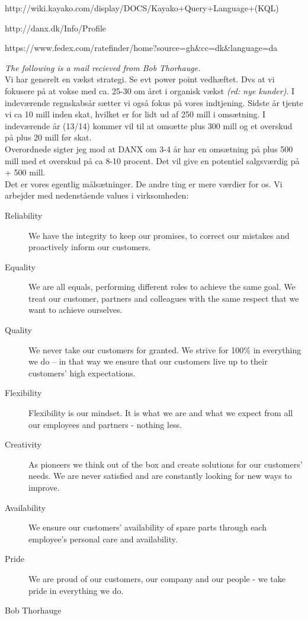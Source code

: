 \begin{thebibliography}{9}
	http://wiki.kayako.com/display/DOCS/Kayako+Query+Language+(KQL)

	http://danx.dk/Info/Profile

	https://www.fedex.com/ratefinder/home?source=gh\&cc=dk\&language=da

	\textit{The following is a mail recieved from Bob Thorhauge.}\\
	Vi har generelt en vækst strategi. Se evt power point vedhæftet. Dvs at vi fokusere på at vokse med ca. 25-30 om året i organisk vækst \emph{(rd: nye kunder)}. I indeværende regnskabsår sætter vi også fokus på vores indtjening. Sidste år tjente vi ca 10 mill inden skat, hvilket er for lidt ud af 250 mill i omsætning. I indeværende år (13/14) kommer vil til at omsætte plus 300 mill og et overskud på plus 20 mill før skat.\\
	Overordnede sigter jeg mod at DANX om 3-4 år har en omsætning på plus 500 mill med et overskud på ca 8-10 procent. Det vil give en potentiel salgsværdig på + 500 mill.\\
	Det er vores egentlig målsætninger. De andre ting er mere værdier for os. Vi arbejder med nedenstående values i virksomheden:
\begin{description}
\item[Reliability]
We have the integrity to keep our promises, to correct our mistakes and proactively inform our customers.
\item[Equality]
We are all equals, performing different roles to achieve the same goal.
We treat our customer, partners and colleagues with the same respect that we want to achieve ourselves.
\item[Quality]
We never take our customers for granted.
We strive for 100\% in everything we do – in that way we ensure that our customers live up to their customers’ high expectations.
\item[Flexibility]
Flexibility is our mindset. It is what we are and what we expect from all our employees and partners - nothing less.
\item[Creativity]
As pioneers we think out of the box and create solutions for our customers’ needs.
We are never satisfied and are constantly looking for new ways to improve.
\item[Availability]
We ensure our customers’ availability of spare parts through each employee’s personal care and availability.
\item[Pride]
We are proud of our customers, our company and our people - we take pride in everything we do.
\end{description}
Bob Thorhauge


\end{thebibliography}
